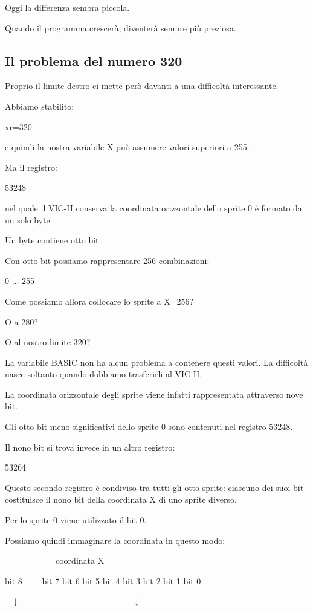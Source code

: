 \documentclass{article}
\begin{document}
Oggi la differenza sembra piccola.

Quando il programma crescerà, diventerà sempre più preziosa.

\subsection{Il problema del numero 320}
Proprio il limite destro ci mette però davanti a una difficoltà interessante.

Abbiamo stabilito:

xr=320

e quindi la nostra variabile X può assumere valori superiori a 255.

Ma il registro:

53248

nel quale il VIC-II conserva la coordinata orizzontale dello sprite 0 è formato da un solo byte.

Un byte contiene otto bit.

Con otto bit possiamo rappresentare 256 combinazioni:

0 ... 255

Come possiamo allora collocare lo sprite a X=256?

O a 280?

O al nostro limite 320?

La variabile BASIC non ha alcun problema a contenere questi valori. La difficoltà nasce soltanto quando dobbiamo
trasferirli al VIC-II.

La coordinata orizzontale degli sprite viene infatti rappresentata attraverso nove bit.

Gli otto bit meno significativi dello sprite 0 sono contenuti nel registro 53248.

Il nono bit si trova invece in un altro registro:

53264

Questo secondo registro è condiviso tra tutti gli otto sprite: ciascuno dei suoi bit costituisce il nono bit della
coordinata X di uno sprite diverso.

Per lo sprite 0 viene utilizzato il bit 0.

Possiamo quindi immaginare la coordinata in questo modo:

\ \ \ \ \ \ \ \ \ \ \ \ coordinata X


\bigskip

bit 8 \ \ \ \ bit 7 bit 6 bit 5 bit 4 bit 3 bit 2 bit 1 bit 0

\ \ ↓ \ \ \ \ \ \ \ \ \ \ \ \ \ \ \ \ \ \ \ \ \ \ \ \ \ \ \ ↓
\end{document}
